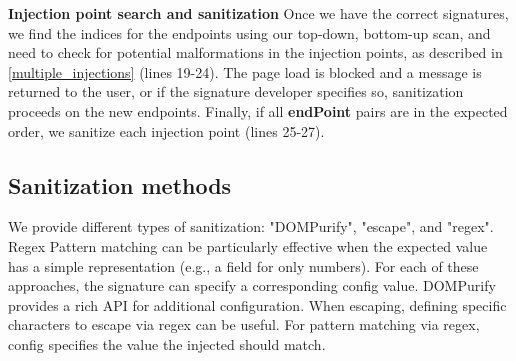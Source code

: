 \textbf{Injection point search and sanitization}
Once we have the correct signatures, we find the indices for the endpoints using our top-down, bottom-up scan, and need to check for potential malformations in the injection points, as described in \autoref{multiple_injections} (lines 19-24). The page load is blocked and a message is returned to the user, or if the signature developer specifies so, sanitization proceeds on the new endpoints. Finally, if all \textbf{endPoint} pairs are in the expected order, we sanitize each injection point (lines 25-27).

\subsection{Sanitization methods} \label{sanitization_methods}
We provide different types of sanitization: "DOMPurify", "escape", and "regex". Regex Pattern matching can be particularly effective when the expected value has a simple representation (e.g., a field for only numbers). For each of these approaches, the signature can specify a corresponding config value. DOMPurify provides a rich API for additional configuration. When escaping, defining specific characters to escape via regex can be useful. For pattern matching via regex, config specifies the value the injected should match.
